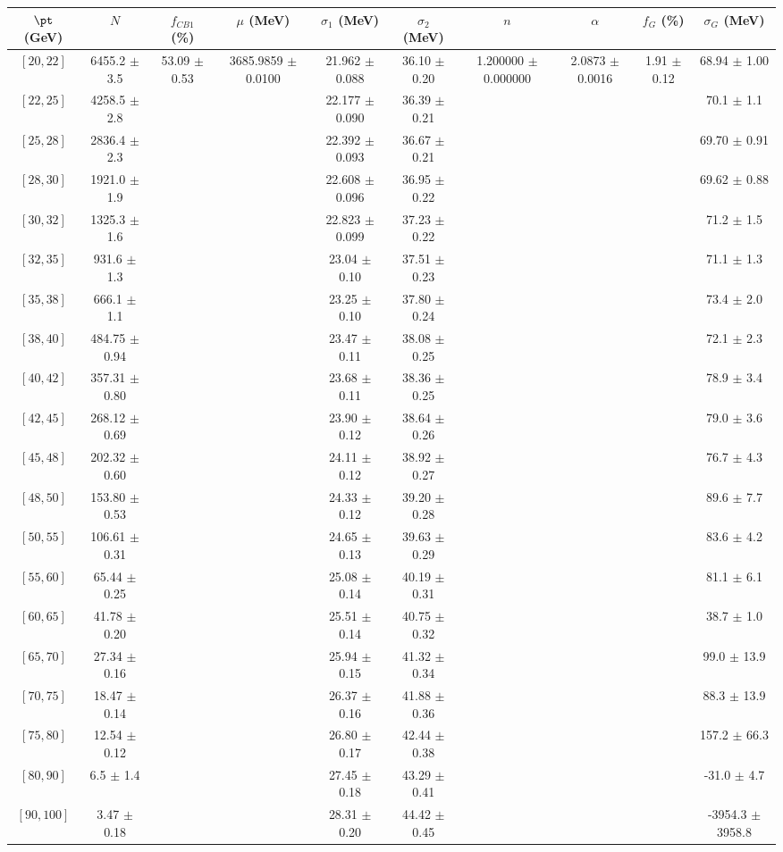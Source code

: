 \begin{tabular}{c||c|c|c|c|c|c|c|c|c}
$\pt$ (GeV) & $N$ & $f_{CB1}$ (\%)  & $\mu$ (MeV) & $\sigma_1$ (MeV) & $\sigma_2$ (MeV) & $n$ & $\alpha$ & $f_G$ (\%) & $\sigma_G$ (MeV) \\
\hline
$[20, 22]$ & 6455.2 $\pm$ 3.5 & \multirow{20}{*}{53.09 $\pm$ 0.53} & \multirow{20}{*}{3685.9859 $\pm$ 0.0100} & 21.962 $\pm$ 0.088 & 36.10 $\pm$ 0.20 & \multirow{20}{*}{1.200000 $\pm$ 0.000000} & \multirow{20}{*}{2.0873 $\pm$ 0.0016} & \multirow{20}{*}{1.91 $\pm$ 0.12} & 68.94 $\pm$ 1.00\\
$[22, 25]$ & 4258.5 $\pm$ 2.8 &  &  & 22.177 $\pm$ 0.090 & 36.39 $\pm$ 0.21 &  &  &  & 70.1 $\pm$ 1.1\\
$[25, 28]$ & 2836.4 $\pm$ 2.3 &  &  & 22.392 $\pm$ 0.093 & 36.67 $\pm$ 0.21 &  &  &  & 69.70 $\pm$ 0.91\\
$[28, 30]$ & 1921.0 $\pm$ 1.9 &  &  & 22.608 $\pm$ 0.096 & 36.95 $\pm$ 0.22 &  &  &  & 69.62 $\pm$ 0.88\\
$[30, 32]$ & 1325.3 $\pm$ 1.6 &  &  & 22.823 $\pm$ 0.099 & 37.23 $\pm$ 0.22 &  &  &  & 71.2 $\pm$ 1.5\\
$[32, 35]$ & 931.6 $\pm$ 1.3 &  &  & 23.04 $\pm$ 0.10 & 37.51 $\pm$ 0.23 &  &  &  & 71.1 $\pm$ 1.3\\
$[35, 38]$ & 666.1 $\pm$ 1.1 &  &  & 23.25 $\pm$ 0.10 & 37.80 $\pm$ 0.24 &  &  &  & 73.4 $\pm$ 2.0\\
$[38, 40]$ & 484.75 $\pm$ 0.94 &  &  & 23.47 $\pm$ 0.11 & 38.08 $\pm$ 0.25 &  &  &  & 72.1 $\pm$ 2.3\\
$[40, 42]$ & 357.31 $\pm$ 0.80 &  &  & 23.68 $\pm$ 0.11 & 38.36 $\pm$ 0.25 &  &  &  & 78.9 $\pm$ 3.4\\
$[42, 45]$ & 268.12 $\pm$ 0.69 &  &  & 23.90 $\pm$ 0.12 & 38.64 $\pm$ 0.26 &  &  &  & 79.0 $\pm$ 3.6\\
$[45, 48]$ & 202.32 $\pm$ 0.60 &  &  & 24.11 $\pm$ 0.12 & 38.92 $\pm$ 0.27 &  &  &  & 76.7 $\pm$ 4.3\\
$[48, 50]$ & 153.80 $\pm$ 0.53 &  &  & 24.33 $\pm$ 0.12 & 39.20 $\pm$ 0.28 &  &  &  & 89.6 $\pm$ 7.7\\
$[50, 55]$ & 106.61 $\pm$ 0.31 &  &  & 24.65 $\pm$ 0.13 & 39.63 $\pm$ 0.29 &  &  &  & 83.6 $\pm$ 4.2\\
$[55, 60]$ & 65.44 $\pm$ 0.25 &  &  & 25.08 $\pm$ 0.14 & 40.19 $\pm$ 0.31 &  &  &  & 81.1 $\pm$ 6.1\\
$[60, 65]$ & 41.78 $\pm$ 0.20 &  &  & 25.51 $\pm$ 0.14 & 40.75 $\pm$ 0.32 &  &  &  & 38.7 $\pm$ 1.0\\
$[65, 70]$ & 27.34 $\pm$ 0.16 &  &  & 25.94 $\pm$ 0.15 & 41.32 $\pm$ 0.34 &  &  &  & 99.0 $\pm$ 13.9\\
$[70, 75]$ & 18.47 $\pm$ 0.14 &  &  & 26.37 $\pm$ 0.16 & 41.88 $\pm$ 0.36 &  &  &  & 88.3 $\pm$ 13.9\\
$[75, 80]$ & 12.54 $\pm$ 0.12 &  &  & 26.80 $\pm$ 0.17 & 42.44 $\pm$ 0.38 &  &  &  & 157.2 $\pm$ 66.3\\
$[80, 90]$ & 6.5 $\pm$ 1.4 &  &  & 27.45 $\pm$ 0.18 & 43.29 $\pm$ 0.41 &  &  &  & -31.0 $\pm$ 4.7\\
$[90, 100]$ & 3.47 $\pm$ 0.18 &  &  & 28.31 $\pm$ 0.20 & 44.42 $\pm$ 0.45 &  &  &  & -3954.3 $\pm$ 3958.8\\
\end{tabular}
